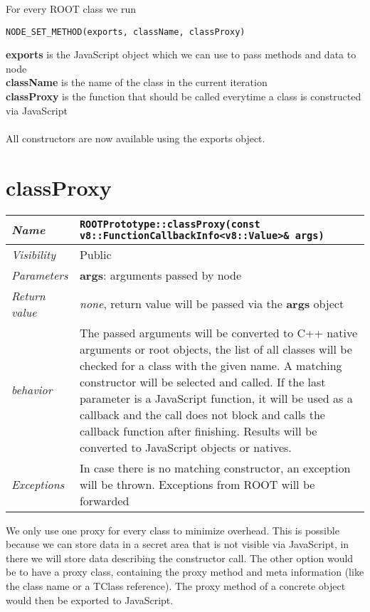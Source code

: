 For every ROOT class we run
\begin{verbatim}
NODE_SET_METHOD(exports, className, classProxy)
\end{verbatim}

\textbf{exports} is the JavaScript object which we can use to pass methods and data to node \\
\textbf{className} is the name of the class in the current iteration\\
\textbf{classProxy} is the function that should be called everytime a class is constructed via JavaScript\\
\\
All constructors are now available using the exports object.
\newpage
\section{classProxy}
\begin{longtable}{p{3cm} @{\hskip 1cm} p{12cm}}
  \hline
  \textit{Name} & \texttt{ROOTPrototype::classProxy(const v8::FunctionCallbackInfo<v8::Value>\& args)} \\
  \hline
  \textit{Visibility} & Public \\
  \hline
  \textit{Parameters} & \textbf{args}: arguments passed by node \\
  \hline
  \textit{Return value} & \textit{none}, return value will be passed via the \textbf{args} object \\
  \hline
  \textit{behavior} & The passed arguments will be converted to C++ native arguments or root objects, the list of all classes will be checked for a class with the given name. A matching constructor will be selected and called.
  If the last parameter is a JavaScript function, it will be used as a callback and the call does not block and calls the callback function after finishing.
  Results will be converted to JavaScript objects or natives. \\
  \hline
  \textit{Exceptions} & In case there is no matching constructor, an exception will be thrown.
  Exceptions from ROOT will be forwarded \\
  \hline
\end{longtable}
We only use one proxy for every class to minimize overhead. This is possible because we can store data in a secret area that is not visible via JavaScript, in there we will store data describing the constructor call.
The other option would be to have a proxy class, containing the proxy method and meta information (like the class name or a TClass reference).
The proxy method of a concrete object would then be exported to JavaScript.

